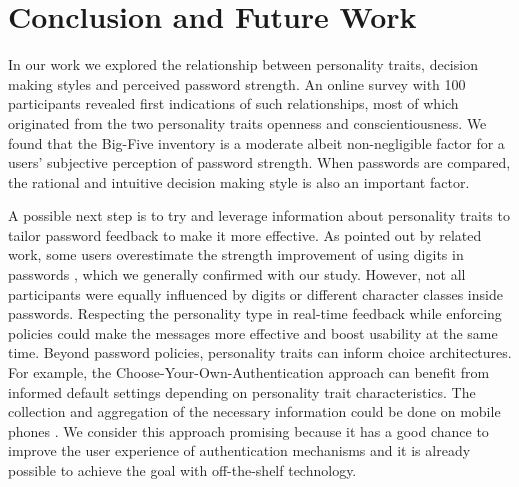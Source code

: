 
\section{Conclusion and Future Work}
In our work we explored the relationship between personality traits, decision making styles and perceived password strength. An online survey with 100 participants revealed first indications of such relationships, most of which originated from the two personality traits openness and conscientiousness. We found that the Big-Five inventory is a moderate albeit non-negligible factor for a users' subjective perception of password strength. When passwords are compared, the rational and intuitive decision making style is also an important factor. 

A possible next step is to try and leverage information about personality traits to tailor password feedback to make it more effective. As pointed out by related work, some users overestimate the strength improvement of using digits in passwords \cite{Ur2016PerceptionsPassword}, which we generally confirmed with our study. However, not all participants were equally influenced by digits or different character classes inside passwords. Respecting the personality type in real-time feedback while enforcing policies could make the messages more effective and boost usability at the same time. Beyond password policies, personality traits can inform choice architectures. For example, the Choose-Your-Own-Authentication approach \cite{Forget2015CYOA} can benefit from informed default settings depending on personality trait characteristics. The collection and aggregation of the necessary information could be done on mobile phones \cite{DeMontjoye2013}. We consider this approach promising because it has a good chance to improve the user experience of authentication mechanisms and it is already possible to achieve the goal with off-the-shelf technology.

